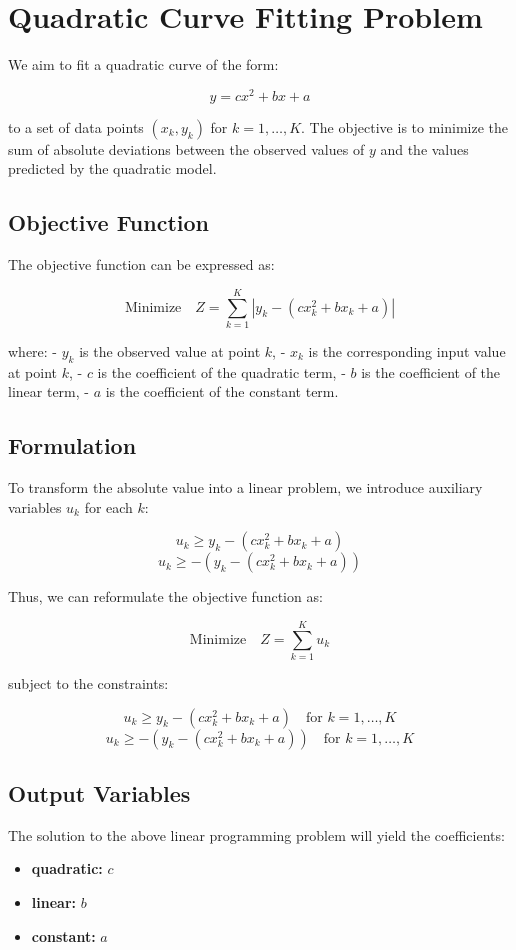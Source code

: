 \documentclass{article}
\begin{document}
\section*{Quadratic Curve Fitting Problem}

We aim to fit a quadratic curve of the form:

\[
y = c x^2 + b x + a
\]

to a set of data points \((x_k, y_k)\) for \(k = 1, \ldots, K\). The objective is to minimize the sum of absolute deviations between the observed values of \(y\) and the values predicted by the quadratic model.

\subsection*{Objective Function}

The objective function can be expressed as:

\[
\text{Minimize} \quad Z = \sum_{k=1}^{K} |y_k - (c x_k^2 + b x_k + a)|
\]

where:
- \(y_k\) is the observed value at point \(k\),
- \(x_k\) is the corresponding input value at point \(k\),
- \(c\) is the coefficient of the quadratic term,
- \(b\) is the coefficient of the linear term,
- \(a\) is the coefficient of the constant term.

\subsection*{Formulation}

To transform the absolute value into a linear problem, we introduce auxiliary variables \(u_k\) for each \(k\):

\[
u_k \geq y_k - (c x_k^2 + b x_k + a)
\]
\[
u_k \geq -(y_k - (c x_k^2 + b x_k + a))
\]

Thus, we can reformulate the objective function as:

\[
\text{Minimize} \quad Z = \sum_{k=1}^{K} u_k
\]

subject to the constraints:

\[
u_k \geq y_k - (c x_k^2 + b x_k + a) \quad \text{for } k = 1, \ldots, K
\]
\[
u_k \geq -(y_k - (c x_k^2 + b x_k + a)) \quad \text{for } k = 1, \ldots, K
\]

\subsection*{Output Variables}

The solution to the above linear programming problem will yield the coefficients:

\begin{itemize}
    \item \textbf{quadratic:} \(c\)
    \item \textbf{linear:} \(b\)
    \item \textbf{constant:} \(a\)
\end{itemize}
\end{document}

